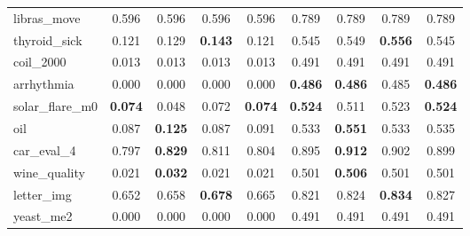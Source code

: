 \begin{figure}[ht]
\begin{tabular}{p{22mm}|*4{p{14mm}}|*4{p{14mm}}}
        libras\_move&\multicolumn{1}{c}{0.596}&\multicolumn{1}{c}{0.596}&\multicolumn{1}{c}{0.596}&\multicolumn{1}{c|}{0.596}&\multicolumn{1}{c}{0.789}&\multicolumn{1}{c}{0.789}&\multicolumn{1}{c}{0.789}&\multicolumn{1}{c}{0.789}\\
        thyroid\_sick&\multicolumn{1}{c}{0.121}&\multicolumn{1}{c}{0.129}&\multicolumn{1}{c}{\textbf{0.143}}&\multicolumn{1}{c|}{0.121}&\multicolumn{1}{c}{0.545}&\multicolumn{1}{c}{0.549}&\multicolumn{1}{c}{\textbf{0.556}}&\multicolumn{1}{c}{0.545}\\
        coil\_2000&\multicolumn{1}{c}{0.013}&\multicolumn{1}{c}{0.013}&\multicolumn{1}{c}{0.013}&\multicolumn{1}{c|}{0.013}&\multicolumn{1}{c}{0.491}&\multicolumn{1}{c}{0.491}&\multicolumn{1}{c}{0.491}&\multicolumn{1}{c}{0.491}\\
        arrhythmia&\multicolumn{1}{c}{0.000}&\multicolumn{1}{c}{0.000}&\multicolumn{1}{c}{0.000}&\multicolumn{1}{c|}{0.000}&\multicolumn{1}{c}{\textbf{0.486}}&\multicolumn{1}{c}{\textbf{0.486}}&\multicolumn{1}{c}{0.485}&\multicolumn{1}{c}{\textbf{0.486}}\\
        solar\_flare\_m0&\multicolumn{1}{c}{\textbf{0.074}}&\multicolumn{1}{c}{0.048}&\multicolumn{1}{c}{0.072}&\multicolumn{1}{c|}{\textbf{0.074}}&\multicolumn{1}{c}{\textbf{0.524}}&\multicolumn{1}{c}{0.511}&\multicolumn{1}{c}{0.523}&\multicolumn{1}{c}{\textbf{0.524}}\\
        oil&\multicolumn{1}{c}{0.087}&\multicolumn{1}{c}{\textbf{0.125}}&\multicolumn{1}{c}{0.087}&\multicolumn{1}{c|}{0.091}&\multicolumn{1}{c}{0.533}&\multicolumn{1}{c}{\textbf{0.551}}&\multicolumn{1}{c}{0.533}&\multicolumn{1}{c}{0.535}\\
        car\_eval\_4&\multicolumn{1}{c}{0.797}&\multicolumn{1}{c}{\textbf{0.829}}&\multicolumn{1}{c}{0.811}&\multicolumn{1}{c|}{0.804}&\multicolumn{1}{c}{0.895}&\multicolumn{1}{c}{\textbf{0.912}}&\multicolumn{1}{c}{0.902}&\multicolumn{1}{c}{0.899}\\
        wine\_quality&\multicolumn{1}{c}{0.021}&\multicolumn{1}{c}{\textbf{0.032}}&\multicolumn{1}{c}{0.021}&\multicolumn{1}{c|}{0.021}&\multicolumn{1}{c}{0.501}&\multicolumn{1}{c}{\textbf{0.506}}&\multicolumn{1}{c}{0.501}&\multicolumn{1}{c}{0.501}\\
        letter\_img&\multicolumn{1}{c}{0.652}&\multicolumn{1}{c}{0.658}&\multicolumn{1}{c}{\textbf{0.678}}&\multicolumn{1}{c|}{0.665}&\multicolumn{1}{c}{0.821}&\multicolumn{1}{c}{0.824}&\multicolumn{1}{c}{\textbf{0.834}}&\multicolumn{1}{c}{0.827}\\
        yeast\_me2&\multicolumn{1}{c}{0.000}&\multicolumn{1}{c}{0.000}&\multicolumn{1}{c}{0.000}&\multicolumn{1}{c|}{0.000}&\multicolumn{1}{c}{0.491}&\multicolumn{1}{c}{0.491}&\multicolumn{1}{c}{0.491}&\multicolumn{1}{c}{0.491}\\

\end{tabular}
\end{figure}
